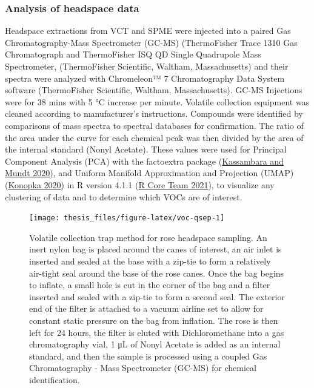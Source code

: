 \documentclass[12pt,final,CPage]{ufthesis}
\begin{document}
{  \hypertarget{mm-voc-analyze}{%
  \subsubsection{Analysis of headspace data}\label{mm-voc-analyze}}

  Headspace extractions from VCT and SPME were injected into a paired Gas Chromatography-Mass Spectrometer (GC-MS) (ThermoFisher Trace 1310 Gas Chromatograph and ThermoFisher ISQ QD Single Quadrupole Mass Spectrometer, (ThermoFisher Scientific, Waltham, Massachusetts) and their spectra were analyzed with Chromeleon™ 7 Chromatography Data System software (ThermoFisher Scientific, Waltham, Massachusetts). GC-MS Injections were for 38 mins with 5 °C increase per minute. Volatile collection equipment was cleaned according to manufacturer's instructions. Compounds were identified by comparisons of mass spectra to spectral databases for confirmation. The ratio of the area under the curve for each chemical peak was then divided by the area of the internal standard (Nonyl Acetate). These values were used for Principal Component Analysis (PCA) with the factoextra package (\protect\hyperlink{ref-Kassambara2020a}{Kassambara and Mundt 2020}), and Uniform Manifold Approximation and Projection (UMAP) (\protect\hyperlink{ref-Konopka2020a}{Konopka 2020}) in R version 4.1.1 (\protect\hyperlink{ref-RCT2021}{R Core Team 2021}), to visualize any clustering of data and to determine which VOCs are of interest.
  \begin{figure}

  {\centering \texttt{[image: thesis\_files/figure-latex/voc-qsep-1]} 

  }

  \caption[Volatile collection trap method for rose headspace sampling]{Volatile collection trap method for rose headspace sampling. An inert nylon bag is placed around the canes of interest, an air inlet is inserted and sealed at the base with a zip-tie to form a relatively air-tight seal around the base of the rose canes. Once the bag begins to inflate, a small hole is cut in the corner of the bag and a filter inserted and sealed with a zip-tie to form a second seal. The exterior end of the filter is attached to a vacuum airline set to allow for constant static pressure on the bag from inflation. The rose is then left for 24 hours, the filter is eluted with Dichloromethane into a gas chromatography vial, 1 \si{\micro\liter} of Nonyl Acetate is added as an internal standard, and then the sample is processed using a coupled Gas Chromatography - Mass Spectrometer (GC-MS) for chemical identification.}\label{fig:voc-qsep}
  \end{figure}
  \begin{figure}


\end{figure}}
\end{document}
